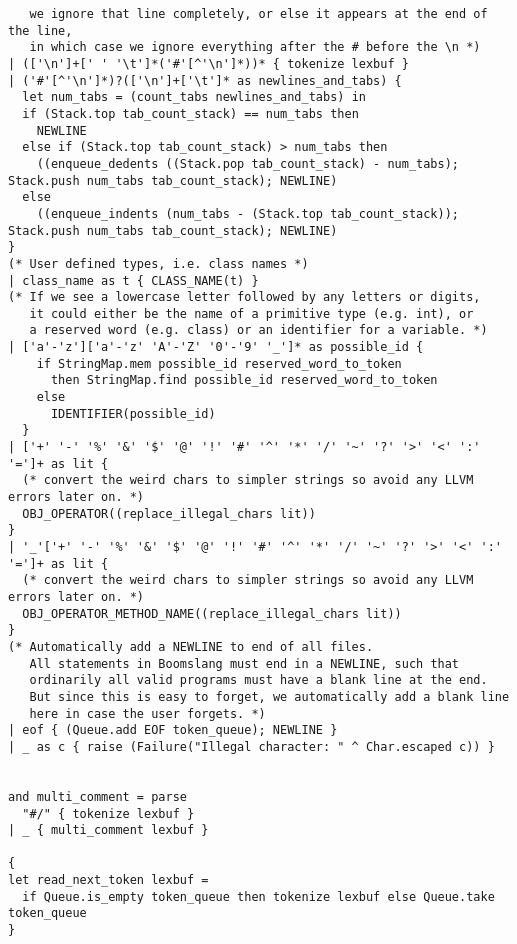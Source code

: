 \documentclass{article}
\begin{document}
\begin{verbatim}
   we ignore that line completely, or else it appears at the end of the line,
   in which case we ignore everything after the # before the \n *)
| (['\n']+[' ' '\t']*('#'[^'\n']*))* { tokenize lexbuf }
| ('#'[^'\n']*)?(['\n']+['\t']* as newlines_and_tabs) {
  let num_tabs = (count_tabs newlines_and_tabs) in
  if (Stack.top tab_count_stack) == num_tabs then
    NEWLINE
  else if (Stack.top tab_count_stack) > num_tabs then
    ((enqueue_dedents ((Stack.pop tab_count_stack) - num_tabs); Stack.push num_tabs tab_count_stack); NEWLINE)
  else
    ((enqueue_indents (num_tabs - (Stack.top tab_count_stack)); Stack.push num_tabs tab_count_stack); NEWLINE)
}
(* User defined types, i.e. class names *)
| class_name as t { CLASS_NAME(t) }
(* If we see a lowercase letter followed by any letters or digits,
   it could either be the name of a primitive type (e.g. int), or
   a reserved word (e.g. class) or an identifier for a variable. *)
| ['a'-'z']['a'-'z' 'A'-'Z' '0'-'9' '_']* as possible_id {
    if StringMap.mem possible_id reserved_word_to_token
      then StringMap.find possible_id reserved_word_to_token
    else
      IDENTIFIER(possible_id)
  }
| ['+' '-' '%' '&' '$' '@' '!' '#' '^' '*' '/' '~' '?' '>' '<' ':' '=']+ as lit {
  (* convert the weird chars to simpler strings so avoid any LLVM errors later on. *)
  OBJ_OPERATOR((replace_illegal_chars lit))
}
| '_'['+' '-' '%' '&' '$' '@' '!' '#' '^' '*' '/' '~' '?' '>' '<' ':' '=']+ as lit {
  (* convert the weird chars to simpler strings so avoid any LLVM errors later on. *)
  OBJ_OPERATOR_METHOD_NAME((replace_illegal_chars lit))
}
(* Automatically add a NEWLINE to end of all files.
   All statements in Boomslang must end in a NEWLINE, such that
   ordinarily all valid programs must have a blank line at the end.
   But since this is easy to forget, we automatically add a blank line
   here in case the user forgets. *)
| eof { (Queue.add EOF token_queue); NEWLINE }
| _ as c { raise (Failure("Illegal character: " ^ Char.escaped c)) }


and multi_comment = parse
  "#/" { tokenize lexbuf }
| _ { multi_comment lexbuf }

{
let read_next_token lexbuf =
  if Queue.is_empty token_queue then tokenize lexbuf else Queue.take token_queue
}
\end{verbatim}
\end{document}
